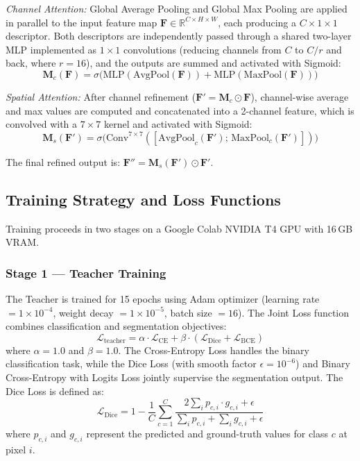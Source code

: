 \documentclass[conference]{IEEEtran}
\begin{document}
\noindent\textit{Channel Attention:} Global Average Pooling and Global Max Pooling are applied in parallel to the input feature map $\mathbf{F} \in \mathbb{R}^{C \times H \times W}$, each producing a $C{\times}1{\times}1$ descriptor. Both descriptors are independently passed through a shared two-layer MLP implemented as $1{\times}1$ convolutions (reducing channels from $C$ to $C/r$ and back, where $r{=}16$), and the outputs are summed and activated with Sigmoid:
\begin{equation}
    \mathbf{M}_c(\mathbf{F}) = \sigma\big(\text{MLP}(\text{AvgPool}(\mathbf{F})) + \text{MLP}(\text{MaxPool}(\mathbf{F}))\big)
\end{equation}

\noindent\textit{Spatial Attention:} After channel refinement ($\mathbf{F}' = \mathbf{M}_c \odot \mathbf{F}$), channel-wise average and max values are computed and concatenated into a 2-channel feature, which is convolved with a $7{\times}7$ kernel and activated with Sigmoid:
\begin{equation}
    \mathbf{M}_s(\mathbf{F}') = \sigma\big(\text{Conv}^{7\times7}([\text{AvgPool}_c(\mathbf{F}');\, \text{MaxPool}_c(\mathbf{F}')])\big)
\end{equation}

The final refined output is: $\mathbf{F}'' = \mathbf{M}_s(\mathbf{F}') \odot \mathbf{F}'$.

\subsection{Training Strategy and Loss Functions}

Training proceeds in two stages on a Google Colab NVIDIA T4 GPU with 16\,GB VRAM.

\subsubsection{Stage 1 --- Teacher Training}
The Teacher is trained for 15 epochs using Adam optimizer (learning rate $= 1{\times}10^{-4}$, weight decay $= 1{\times}10^{-5}$, batch size $= 16$). The Joint Loss function combines classification and segmentation objectives:
\begin{equation}
    \mathcal{L}_{\text{teacher}} = \alpha \cdot \mathcal{L}_{\text{CE}} + \beta \cdot (\mathcal{L}_{\text{Dice}} + \mathcal{L}_{\text{BCE}})
\end{equation}
where $\alpha = 1.0$ and $\beta = 1.0$. The Cross-Entropy Loss handles the binary classification task, while the Dice Loss (with smooth factor $\epsilon = 10^{-6}$) and Binary Cross-Entropy with Logits Loss jointly supervise the segmentation output. The Dice Loss is defined as:
\begin{equation}
    \mathcal{L}_{\text{Dice}} = 1 - \frac{1}{C}\sum_{c=1}^{C}\frac{2\sum_{i}p_{c,i} \cdot g_{c,i} + \epsilon}{\sum_{i}p_{c,i} + \sum_{i}g_{c,i} + \epsilon}
\end{equation}
where $p_{c,i}$ and $g_{c,i}$ represent the predicted and ground-truth values for class $c$ at pixel $i$.
\end{document}
